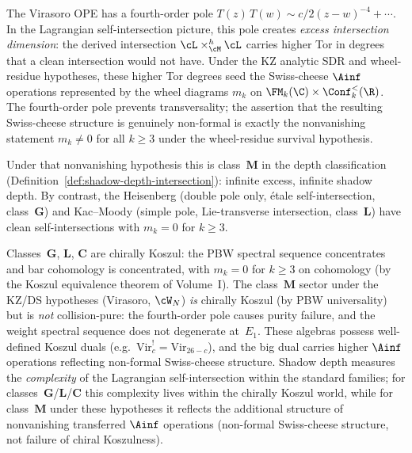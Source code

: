 \begin{remark}
The Virasoro OPE has a fourth-order pole
$T(z)\,T(w) \sim c/2(z-w)^{-4} + \cdots$.
In the Lagrangian self-intersection picture, this pole
creates \emph{excess intersection dimension}: the derived
intersection
$\cL \times_{\cM}^h \cL$ carries higher Tor in degrees that
a clean intersection would not have. Under the KZ analytic SDR and
wheel-residue hypotheses, these higher Tor degrees seed the
Swiss-cheese $\Ainf$ operations represented by the wheel diagrams
$m_k$ on $\FM_k(\C) \times \Conf_k^{<}(\R)$. The fourth-order pole
prevents transversality; the assertion that the resulting
Swiss-cheese structure is genuinely non-formal is exactly the
nonvanishing statement $m_k \ne 0$ for all $k \ge 3$ under the
wheel-residue survival hypothesis.

Under that nonvanishing hypothesis this is class~$\mathbf{M}$ in the
depth classification
(Definition~\ref{def:shadow-depth-intersection}): infinite
excess, infinite shadow depth. By contrast, the Heisenberg
(double pole only, \'etale self-intersection,
class~$\mathbf{G}$) and Kac--Moody (simple pole,
Lie-transverse intersection, class~$\mathbf{L}$) have clean
self-intersections with $m_k = 0$ for $k \ge 3$.

Classes~$\mathbf{G}$, $\mathbf{L}$, $\mathbf{C}$ are
chirally Koszul: the PBW spectral sequence concentrates
and bar cohomology is concentrated, with $m_k = 0$ for
$k \ge 3$ on cohomology
(by the Koszul equivalence theorem of Volume~I).
The class~$\mathbf{M}$ sector under the KZ/DS hypotheses
(Virasoro, $\cW_N$) \emph{is}
chirally Koszul (by PBW universality) but is \emph{not}
collision-pure: the fourth-order pole causes purity
failure, and the weight spectral sequence does not
degenerate at~$E_1$. These algebras possess well-defined
Koszul duals (e.g.\ $\mathrm{Vir}_c^! = \mathrm{Vir}_{26-c}$),
and the big dual carries higher $\Ainf$ operations
reflecting non-formal Swiss-cheese structure.
Shadow depth measures the \emph{complexity} of the
Lagrangian self-intersection within the standard
families; for classes~$\mathbf{G}$/$\mathbf{L}$/$\mathbf{C}$
this complexity lives within the chirally Koszul world,
while for class~$\mathbf{M}$ under these hypotheses it reflects the additional
structure of nonvanishing transferred $\Ainf$ operations
(non-formal Swiss-cheese structure, not failure of chiral
Koszulness).
\end{remark}

